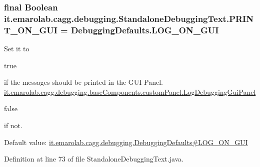 \hypertarget{classit_1_1emarolab_1_1cagg_1_1debugging_1_1StandaloneDebuggingText_adacca5525ce59ace095bca4813d10b93}{
\subsubsection[{P\-R\-I\-N\-T\-\_\-\-O\-N\-\_\-\-G\-U\-I}]{\setlength{\rightskip}{0pt plus 5cm}final Boolean it.\-emarolab.\-cagg.\-debugging.\-Standalone\-Debugging\-Text.\-P\-R\-I\-N\-T\-\_\-\-O\-N\-\_\-\-G\-U\-I = {\bf Debugging\-Defaults.\-L\-O\-G\-\_\-\-O\-N\-\_\-\-G\-U\-I}\hspace{0.3cm}{\ttfamily [static]}}}\label{classit_1_1emarolab_1_1cagg_1_1debugging_1_1StandaloneDebuggingText_adacca5525ce59ace095bca4813d10b93}
Set it to
\begin{DoxyCode}
\textcolor{keyword}{true} 
\end{DoxyCode}
 if the messages should be printed in the G\-U\-I Panel. \hyperlink{classit_1_1emarolab_1_1cagg_1_1debugging_1_1baseComponents_1_1customPanel_1_1LogDebuggingGuiPanel}{it.\-emarolab.\-cagg.\-debugging.\-base\-Components.\-custom\-Panel.\-Log\-Debugging\-Gui\-Panel} 
\begin{DoxyCode}
\textcolor{keyword}{false} 
\end{DoxyCode}
 if not. \par
 Default value\-: \hyperlink{classit_1_1emarolab_1_1cagg_1_1debugging_1_1DebuggingDefaults_a82d4435a02f409eff194853e9ae63499}{it.\-emarolab.\-cagg.\-debugging.\-Debugging\-Defaults\#\-L\-O\-G\-\_\-\-O\-N\-\_\-\-G\-U\-I} 

Definition at line 73 of file Standalone\-Debugging\-Text.\-java.

